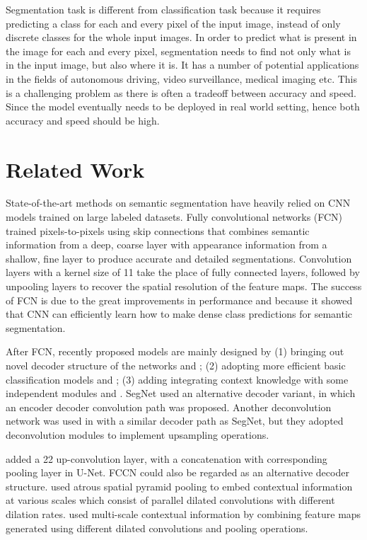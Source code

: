 \documentclass{article}
\begin{document}
Segmentation task is different from classification task because it requires predicting a class for each and every pixel of the input image, instead of only discrete classes for the whole input images. In order to predict what is present in the image for each and every pixel, segmentation needs to find not only what is in the input image, but also where it is. It has a number of potential applications in
the fields of autonomous driving, video surveillance, medical imaging etc. This is a challenging problem as there is often a tradeoff between accuracy and speed. Since the model eventually needs to be deployed in real world setting, hence both accuracy and speed should be high.

\section{Related Work}

State-of-the-art methods on semantic segmentation have heavily relied on CNN models trained on large labeled datasets. Fully convolutional networks (FCN) trained pixels-to-pixels using skip connections that combines semantic information from a deep, coarse layer with appearance information from a shallow, fine layer to produce accurate and detailed segmentations. Convolution layers with a kernel size of 11 take the place of fully connected layers, followed by unpooling layers to recover the spatial resolution of the feature maps. The success of FCN is due to the great improvements in performance and because it showed that CNN can efficiently learn how to make dense class predictions for semantic segmentation.

After FCN, recently proposed models are mainly designed by (1) bringing out novel decoder structure of the networks \citep{girshick2014rich} and \citep{badrinarayanan2017segnet}; (2) adopting more efficient basic classification models \citep{liu2015semantic} and \citep{bittel2015pixel}; (3) adding integrating context knowledge with some independent modules \citep{zhu2015segdeepm} and \citep{ronneberger2015u}. SegNet \citep{badrinarayanan2017segnet} used an alternative decoder variant, in which an encoder decoder convolution path was proposed. Another deconvolution network was used in \citep{noh2015learning} with a similar decoder path as SegNet, but they adopted deconvolution modules to implement upsampling operations. 

\citep{ronneberger2015u} added a 22 up-convolution layer, with a concatenation with corresponding pooling layer in U-Net. FCCN \citep{lin2016efficient} could also be regarded as an alternative decoder structure. \citep{chen2018encoder} used atrous spatial pyramid pooling to embed contextual information at various scales which consist of parallel dilated convolutions with different dilation rates. \citep{zhao2017pyramid} used multi-scale contextual information by combining feature maps generated using different dilated convolutions and pooling operations.
\end{document}
